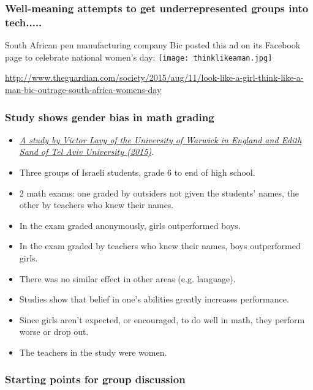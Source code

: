 \documentclass{beamer}
\begin{document}
\begin{frame}
\frametitle{Well-meaning attempts to get underrepresented groups into tech.....}
South African pen manufacturing company Bic posted this ad on its Facebook page to celebrate national women's day:
\texttt{[image: thinklikeaman.jpg]}

{\tiny \href{http://www.theguardian.com/society/2015/aug/11/look-like-a-girl-think-like-a-man-bic-outrage-south-africa-womens-day}{http://www.theguardian.com/society/2015/aug/11/look-like-a-girl-think-like-a-man-bic-outrage-south-africa-womens-day}}
\end{frame}

\begin{frame}
\frametitle{Study shows gender bias in math grading}
\begin{itemize}
\item {\it \href{http://www.slate.com/blogs/xx_factor/2015/02/10/teacher_bias_in_math_new_study_finds_teachers_grade_boys_more_generously.html}{A study by Victor Lavy of the University of Warwick in England and Edith Sand of Tel Aviv University (2015)}}.
\item Three groups of Israeli students, grade 6 to end of high school.
\item 2 math exams: one graded by outsiders not given the students' names, the other by teachers who knew their names.
\item In the exam graded anonymously, girls outperformed boys.
\item In  the exam graded by teachers who knew their names, boys outperformed girls.
\item There was no similar effect in other areas (e.g. language). 
\item Studies show that belief in one's abilities greatly increases performance. 
\item Since girls aren't expected, or encouraged, to do well in math, they perform worse or drop out.
\item The teachers in the study were women.
\end{itemize}
\end{frame}

\begin{frame}
\frametitle{Starting points for group discussion}

\end{frame}
\end{document}
